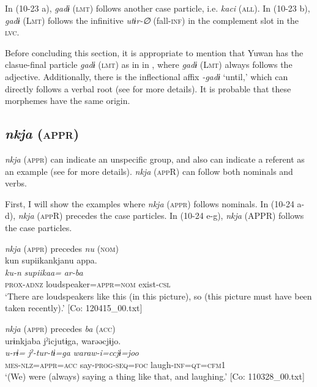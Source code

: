 In (10-23 a), \textit{gadɨ} (\textsc{lmt}) follows another case particle, i.e. \textit{kaci} (\textsc{all}). In (10-23 b), \textit{gadɨ} (L\textsc{mt}) follows the infinitive \textit{utɨr-∅} (fall-\textsc{inf}) in the complement slot in the \textsc{lvc}.

  Before concluding this section, it is appropriate to mention that Yuwan has the clasue-final particle \textit{gadɨ} (\textsc{lmt}) as in  in , where \textit{gadɨ} (L\textsc{mt}) always follows the adjective. Additionally, there is the inflectional affix \textit{{}-gadɨ} ‘until,’ which can directly follows a verbal root (see  for more details). It is probable that these morphemes have the same origin.

\subsection{\textit{nkja} (\textsc{appr})}\label{sec:10.1.6}

\textit{nkja} (\textsc{appr}) can indicate an unspecific group, and also can indicate a referent as an example (see  for more details). \textit{nkja} (\textsc{app}R) can follow both nominals and verbs.

  First, I will show the examples where \textit{nkja} (\textsc{appr}) follows nominals. In (10-24 a-d), \textit{nkja} (\textsc{app}R) precedes the case particles. In (10-24 e-g), \textit{nkja} (APPR) follows the case particles.

\ea\label{ex:10.24} 
  \ea \textit{nkja} (\textsc{appr}) precedes \textit{nu} (\textsc{nom})\\
      \glll    kun  {\textbar}supiika{\textbar}nkjanu  appa.\\
      \textit{ku-n}  \textit{supiikaa=}  \textit{ar-ba}\\
      \textsc{prox}-\textsc{adnz}  loudspeaker=\textsc{appr}=\textsc{nom}  exist-\textsc{csl}\\
      \glt       ‘There are loudspeakers like this (in this picture), so (this picture must have been taken recently).’ [Co: 120415\_00.txt]

  \ex  \textit{nkja} (\textsc{appr}) precedes \textit{ba} (\textsc{acc})\\
      \glll    urɨnkjaba  jˀicjutɨga,  warəəcjɨjo.\\
      \textit{u-rɨ=}  \textit{jˀ-tur-tɨ=ga}  \textit{waraw-i=ccjɨ=joo}\\
      \textsc{mes}-\textsc{nlz}=\textsc{appr}=\textsc{acc}  say-\textsc{prog}-\textsc{seq}=\textsc{foc}  laugh-\textsc{inf}=\textsc{qt}=\textsc{cfm}1\\
      \glt       ‘(We) were (always) saying a thing like that, and laughing.’ [Co: 110328\_00.txt]

